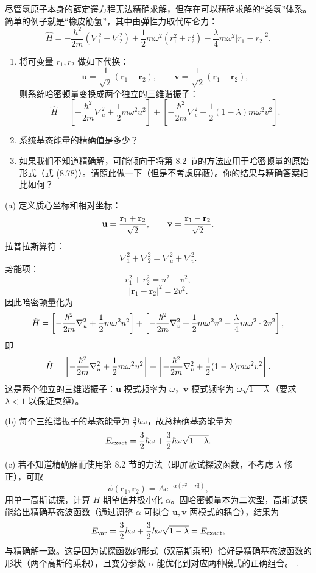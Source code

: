 \begin{question}
尽管氢原子本身的薛定谔方程无法精确求解，但存在可以精确求解的“类氢”体系。简单的例子就是“橡皮筋氢”，其中由弹性力取代库仑力：
\[
\hat H=-\frac{\hbar^2}{2m}(\nabla_1^2+\nabla_2^2)+\frac12m\omega^2(r_1^2+r_2^2)-\frac{\lambda}{4}m\omega^2|r_1-r_2|^2.
\]
\begin{enumerate}
\item 将可变量 $r_1,r_2$ 做如下代换：
\[
\mathbf u=\frac{1}{\sqrt2}(\mathbf r_1+\mathbf r_2),\qquad
\mathbf v=\frac{1}{\sqrt2}(\mathbf r_1-\mathbf r_2),
\]
则系统哈密顿量变换成两个独立的三维谐振子：
\[
\hat H=\left[-\frac{\hbar^2}{2m}\nabla_u^2+\frac12m\omega^2u^2\right]+
\left[-\frac{\hbar^2}{2m}\nabla_v^2+\frac12(1-\lambda)m\omega^2v^2\right].
\]
\item 系统基态能量的精确值是多少？
\item 如果我们不知道精确解，可能倾向于将第 8.2 节的方法应用于哈密顿量的原始形式（式 (8.78)）。请照此做一下（但是不考虑屏蔽）。你的结果与精确答案相比如何？
\end{enumerate}

\par\smallskip
{}

\end{question}
\begin{solution}
(a) 定义质心坐标和相对坐标：
\[
\mathbf u={\mathbf r_1+\mathbf r_2\over\sqrt2},\qquad
\mathbf v={\mathbf r_1-\mathbf r_2\over\sqrt2}.
\]
拉普拉斯算符：
\[
\nabla_1^2+\nabla_2^2=\nabla_u^2+\nabla_v^2.
\]
势能项：
\[
r_1^2+r_2^2=u^2+v^2,
\]
\[
|\mathbf r_1-\mathbf r_2|^2=2v^2.
\]
因此哈密顿量化为
\[
\hat H=\left[-{\hbar^2\over2m}\nabla_u^2+{1\over2}m\omega^2u^2\right]
+\left[-{\hbar^2\over2m}\nabla_v^2+{1\over2}m\omega^2v^2-{\lambda\over4}m\omega^2\cdot2v^2\right],
\]
即
\[
\hat H=\left[-{\hbar^2\over2m}\nabla_u^2+{1\over2}m\omega^2u^2\right]
+\left[-{\hbar^2\over2m}\nabla_v^2+{1\over2}(1-\lambda)m\omega^2v^2\right].
\]
这是两个独立的三维谐振子：$\mathbf u$ 模式频率为 $\omega$，$\mathbf v$ 模式频率为 $\omega\sqrt{1-\lambda}$（要求 $\lambda<1$ 以保证束缚）。

(b) 每个三维谐振子的基态能量为 $\frac32\hbar\omega$，故总精确基态能量为
\[
E_{\rm exact}=\frac32\hbar\omega+\frac32\hbar\omega\sqrt{1-\lambda}.
\]

(c) 若不知道精确解而使用第 8.2 节的方法（即屏蔽试探波函数，不考虑 $\lambda$ 修正），可取
\[
\psi(\mathbf r_1,\mathbf r_2)=A e^{-\alpha(r_1^2+r_2^2)},
\]
用单一高斯试探，计算 $H$ 期望值并极小化 $\alpha$。因哈密顿量本为二次型，高斯试探能给出精确基态波函数（通过调整 $\alpha$ 可拟合 $\mathbf u,\mathbf v$ 两模式的耦合），结果为
\[
E_{\rm var}=\frac32\hbar\omega+\frac32\hbar\omega\sqrt{1-\lambda}=E_{\rm exact},
\]
与精确解一致。这是因为试探函数的形式（双高斯乘积）恰好是精确基态波函数的形状（两个高斯的乘积），且变分参数 $\alpha$ 能优化到对应两种模式的正确组合。
.
\end{solution}

